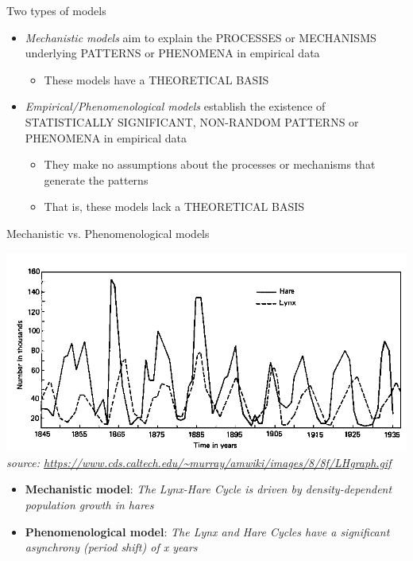 \documentclass[xcolor={usenames,x11names},compress]{beamer}
\renewcommand{\(}{\begin{columns}}
\renewcommand{\)}{\end{columns}}
\newcommand{\<}[1]{\begin{column}{#1}}
\renewcommand{\>}{\end{column}}
\begin{document}
 \begin{frame}{Two types of models}

	\begin{itemize}[<+->]\itemsep20pt

		\item {\it Mechanistic models} aim to explain the PROCESSES or
		MECHANISMS underlying PATTERNS or PHENOMENA in empirical data 
		\begin{itemize}
			\item These models have a THEORETICAL BASIS
		\end{itemize}
 
		\item {\it Empirical/Phenomenological models} establish the existence of
		STATISTICALLY SIGNIFICANT, NON-RANDOM PATTERNS or PHENOMENA in empirical
		data 
		\begin{itemize}
			\item They make no assumptions about the processes or mechanisms that generate the patterns
			\item That is, these models lack a THEORETICAL BASIS
		\end{itemize}
			
	  \end{itemize}
 
 \end{frame}
 
\begin{frame}{Mechanistic vs. Phenomenological models}

\begin{center}
		\includegraphics[width=.7\textwidth]{graphics/L-H_cycle.png}\\
		{\it \tiny source: \url{https://www.cds.caltech.edu/~murray/amwiki/images/8/8f/LHgraph.gif}}
\end{center}
\pause
\begin{itemize}[<+->] \itemsep6pt

	\item {\bf Mechanistic model}: \it The Lynx-Hare Cycle is driven by density-dependent population growth in hares

	\item {\bf Phenomenological model}: \it The Lynx and Hare Cycles have a significant asynchrony (period shift) of x years

\end{itemize}

 \end{frame}
 
\end{document}
